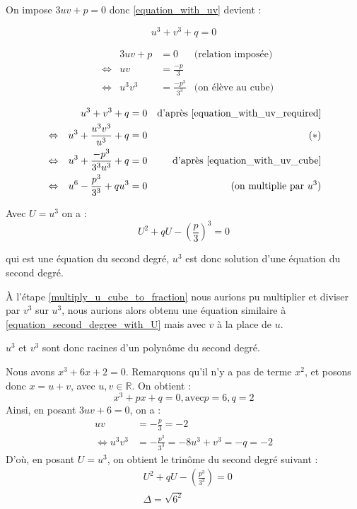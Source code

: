 \documentclass[]{../templates/homework}
\begin{document}
\question On impose $3uv + p = 0$ donc \eqref{equation_with_uv} devient :

\begin{equation*}
	u^3 + v^3 + q = 0 \tag{$E_3$} \label{equation_with_uv_required}
\end{equation*}

\question

\begin{align*}
	 &                 & 3uv + p & = 0                & \text{(relation imposée)}                                           \\
	 & \Leftrightarrow & uv      & = \frac{-p}{3}     &                                                                     \\
	 & \Leftrightarrow & u^3v^3  & = \frac{-p^3}{3^3} & \text{(on élève au cube)} \tag{$E_4$} \label{equation_with_uv_cube}
\end{align*}

\question

\begin{align*}
	 &                 & u^3 + v^3 + q                 & = 0 & \text{d'après \eqref{equation_with_uv_required}} \\
	 & \Leftrightarrow & u^3 + \frac{u^3v^3}{u^3} + q  & = 0 & \tag{$\ast$} \label{multiply_u_cube_to_fraction} \\
	 & \Leftrightarrow & u^3 + \frac{-p^3}{3^3u^3} + q & = 0 & \text{d'après \eqref{equation_with_uv_cube}}     \\
	 & \Leftrightarrow & u^6 - \frac{p^3}{3^3} + qu^3  & = 0 & \text{(on multiplie par $u^3$)}
\end{align*}

Avec $U = u^3$ on a :
\begin{equation}
	\tag{$E_5$}
	U^2 + qU - \left(\frac{p}{3}\right)^3 = 0
	\label{equation_second_degree_with_U}
\end{equation}

qui est une équation du second degré, $u^3$ est donc solution d'une équation du second degré.

À l'étape \eqref{multiply_u_cube_to_fraction} nous aurions pu multiplier et diviser par $v^3$ sur $u^3$, nous aurions alors obtenu une équation similaire à \eqref{equation_second_degree_with_U} mais avec $v$ à la place de $u$.

$u^3$ et $v^3$ sont donc racines d'un polynôme du second degré.

Nous avons $x^3 + 6x + 2 =0$. Remarquons qu'il n'y a pas de terme $x^2$, et posons donc $x = u+v$, avec $u,v \in \mathbb R$. On obtient :
$$x^3 + px + q = 0, \text{avec} p=6, q=2$$
Ainsi, en posant $3uv + 6 = 0$, on a :
\begin{align*}
	      uv &= -\frac{p}{3} = -2 \\
	\iff u^3v^3 &= -\frac{p^3}{3^3}= -8
	u^3 + v^3 = -q = -2
\end{align*}
D'où, en posant $U = u^3$, on obtient le trinôme du second degré suivant : 
\begin{align*}
	&U^2 + qU - \left(\frac{p^3}{3^3}\right)=0 \\
	&\Delta = \sqrt{6^2}
\end{align*}
\end{document}
